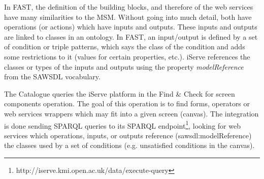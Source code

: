 \documentclass{fast_latex}
\begin{document}
In FAST, the definition of the building blocks, and therefore of the web services have many similarities to the MSM. Without going into much detail, both have operations (or actions) which have inputs and outputs. These inputs and outputs are linked to classes in an ontology. In FAST, an input/output is defined by a set of condition or triple patterns, which says the class of the condition and adds some restrictions to it (values for certain properties, etc.). iServe references the classes or types of the inputs and outputs using the property \emph{modelReference} from the SAWSDL vocabulary.

The Catalogue queries the iServe platform in the Find \& Check for screen components operation. The goal of this operation is to find forms, operators or web services wrappers which may fit into a given screen (canvas). The integration is done sending SPARQL queries to its SPARQL endpoint\footnote{http://iserve.kmi.open.ac.uk/data/execute-query}, looking for web services which operations, inputs, or outputs reference (sawsdl:modelReference) the classes used by a set of conditions (e.g. unsatisfied conditions in the canvas).
\end{document}
